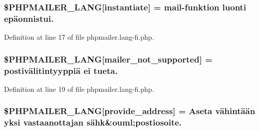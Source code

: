 \subsubsection[{\texorpdfstring{\$\+P\+H\+P\+M\+A\+I\+L\+E\+R\+\_\+\+L\+A\+NG}{$PHPMAILER_LANG}}]{\setlength{\rightskip}{0pt plus 5cm}\$P\+H\+P\+M\+A\+I\+L\+E\+R\+\_\+\+L\+A\+NG\mbox{[}\textquotesingle{}instantiate\textquotesingle{}\mbox{]} = \textquotesingle{}mail-\/funktion luonti epäonnistui.\textquotesingle{}}\hypertarget{phpmailer_8lang-fi_8php_ad58dde16780f4770ccf4dd282ea1f5ad}{}\label{phpmailer_8lang-fi_8php_ad58dde16780f4770ccf4dd282ea1f5ad}


Definition at line 17 of file phpmailer.\+lang-\/fi.\+php.

\subsubsection[{\texorpdfstring{\$\+P\+H\+P\+M\+A\+I\+L\+E\+R\+\_\+\+L\+A\+NG}{$PHPMAILER_LANG}}]{\setlength{\rightskip}{0pt plus 5cm}\$P\+H\+P\+M\+A\+I\+L\+E\+R\+\_\+\+L\+A\+NG\mbox{[}\textquotesingle{}mailer\+\_\+not\+\_\+supported\textquotesingle{}\mbox{]} = \textquotesingle{}postivälitintyyppiä ei tueta.\textquotesingle{}}\hypertarget{phpmailer_8lang-fi_8php_aa2ebcb8833ee83a7ad67401c4bb3a6ad}{}\label{phpmailer_8lang-fi_8php_aa2ebcb8833ee83a7ad67401c4bb3a6ad}


Definition at line 19 of file phpmailer.\+lang-\/fi.\+php.

\subsubsection[{\texorpdfstring{\$\+P\+H\+P\+M\+A\+I\+L\+E\+R\+\_\+\+L\+A\+NG}{$PHPMAILER_LANG}}]{\setlength{\rightskip}{0pt plus 5cm}\$P\+H\+P\+M\+A\+I\+L\+E\+R\+\_\+\+L\+A\+NG\mbox{[}\textquotesingle{}provide\+\_\+address\textquotesingle{}\mbox{]} = \textquotesingle{}Aseta vähintään yksi vastaanottajan sähk\&ouml;postiosoite.\textquotesingle{}}\hypertarget{phpmailer_8lang-fi_8php_a8b97897c2406b7392b056f375feeefbb}{}\label{phpmailer_8lang-fi_8php_a8b97897c2406b7392b056f375feeefbb}


